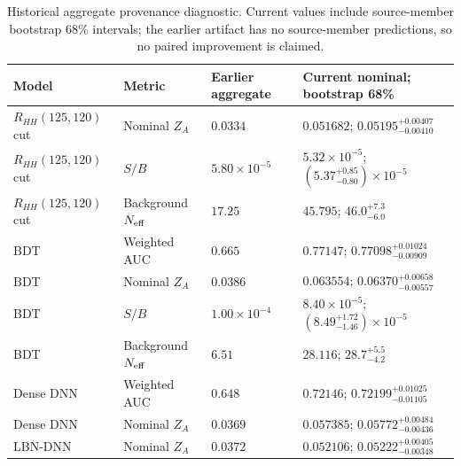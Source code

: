\begin{table}[tb]
  \centering
  \footnotesize
  \caption{Historical aggregate provenance diagnostic. Current values include source-member bootstrap 68\% intervals; the earlier artifact has no source-member predictions, so no paired improvement is claimed.}
  \label{tab:earlier-current}
  \begin{tabular}{llll}
    \toprule
    Model & Metric & Earlier aggregate & Current nominal; bootstrap 68\% \\
    \midrule
    $R_{HH}(125,120)$ cut & Nominal $Z_A$ & $0.0334$ & $0.051682$; $0.05195^{+0.00407}_{-0.00410}$ \\
    $R_{HH}(125,120)$ cut & $S/B$ & $5.80\times10^{-5}$ & $5.32\times10^{-5}$; $(5.37^{+0.85}_{-0.80})\times10^{-5}$ \\
    $R_{HH}(125,120)$ cut & Background $N_{\rm eff}$ & $17.25$ & $45.795$; $46.0^{+7.3}_{-6.0}$ \\
    BDT & Weighted AUC & $0.665$ & $0.77147$; $0.77098^{+0.01024}_{-0.00909}$ \\
    BDT & Nominal $Z_A$ & $0.0386$ & $0.063554$; $0.06370^{+0.00658}_{-0.00557}$ \\
    BDT & $S/B$ & $1.00\times10^{-4}$ & $8.40\times10^{-5}$; $(8.49^{+1.72}_{-1.46})\times10^{-5}$ \\
    BDT & Background $N_{\rm eff}$ & $6.51$ & $28.116$; $28.7^{+5.5}_{-4.2}$ \\
    Dense DNN & Weighted AUC & $0.648$ & $0.72146$; $0.72199^{+0.01025}_{-0.01105}$ \\
    Dense DNN & Nominal $Z_A$ & $0.0369$ & $0.057385$; $0.05772^{+0.00484}_{-0.00436}$ \\
    LBN-DNN & Nominal $Z_A$ & $0.0372$ & $0.052106$; $0.05222^{+0.00405}_{-0.00348}$ \\
    \bottomrule
  \end{tabular}
\end{table}
